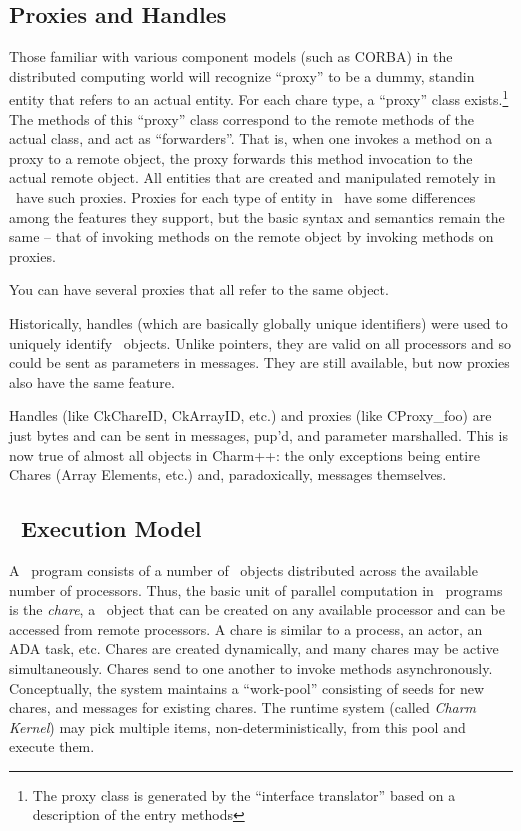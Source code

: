 \subsection{Proxies and Handles}

Those familiar with various component models (such as CORBA) in the
distributed computing world will recognize ``proxy'' to be a dummy, standin
entity that refers to an actual entity.  For each chare type, a ``proxy''
class exists.\footnote{The proxy class is generated by the ``interface
translator'' based on a description of the entry methods}  The methods of
this ``proxy'' class correspond to the remote methods of the actual class, and
act as ``forwarders''. That is, when one invokes a method on a proxy to a
remote object, the proxy forwards this method invocation to the actual
remote object. All entities that are created and manipulated remotely in
\charmpp\ have such proxies. Proxies for each type of entity in \charmpp\
have some differences among the features they support, but the basic syntax
and semantics remain the same -- that of invoking methods on the remote
object by invoking methods on proxies.

You can have several proxies that all refer to the same object.

Historically, handles (which are basically globally unique
identifiers) were used to uniquely identify \charmpp\ objects.  Unlike
pointers, they are valid on all processors and so could be sent as
parameters in messages.  They are still available, but now proxies
also have the same feature.

Handles (like CkChareID, CkArrayID, etc.) and proxies (like
CProxy\_foo) are just bytes and can be sent in messages, pup'd, and
parameter marshalled.  This is now true of almost all objects in
Charm++: the only exceptions being entire Chares (Array Elements,
etc.) and, paradoxically, messages themselves.

\subsection{\charmpp\ Execution Model}

A \charmpp\ program consists of a number of \charmpp\ objects distributed
across the available number of processors. Thus, the basic unit of parallel
computation in \charmpp\ programs is the {\em chare}, a \charmpp\
object that can be created on any available processor and can be accessed from
remote processors.  A \index{chare}chare is similar to a process, an actor, an
ADA task, etc.  \index{chare}Chares are created dynamically, and many chares
may be active simultaneously.  Chares send {\em messages} to one
another to invoke methods asynchronously.  Conceptually, the system maintains a
``work-pool'' consisting of seeds for new \index{chare}chares, and
\index{message}messages for existing chares. The runtime system (called {\em
Charm Kernel}) may pick multiple items, non-deterministically, from this pool
and execute them.  

